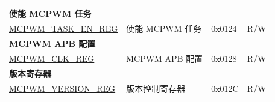 \begin{longtable}{ | p{6cm} | p{7.2cm} | p{1.2cm} | p{1cm} | }
\multicolumn{4}{|l|}{\textbf{使能 MCPWM 任务}} \\ \hline
\hyperref[regdesc:MCPWMTASKENREG]{MCPWM\_TASK\_EN\_REG} & 使能 MCPWM 任务 & 0x0124 & R/W \\ \hline

\multicolumn{4}{|l|}{\textbf{MCPWM APB 配置}} \\ \hline
\hyperref[regdesc:MCPWMCLKREG]{MCPWM\_CLK\_REG} & MCPWM APB 配置 & 0x0128 & R/W \\ \hline

\multicolumn{4}{|l|}{\textbf{版本寄存器}} \\ \hline
\hyperref[regdesc:MCPWMVERSIONREG]{MCPWM\_VERSION\_REG} & 版本控制寄存器 & 0x012C &  R/W \\ \hline
\end{longtable}

